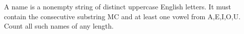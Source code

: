 A name is a nonempty string of distinct uppercase English letters. It must contain the consecutive substring MC and at least one vowel from A,E,I,O,U. Count all such names of any length.
